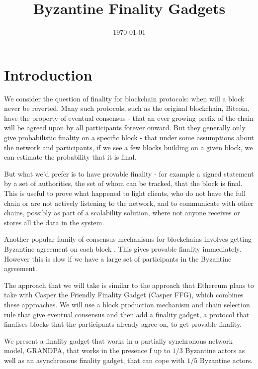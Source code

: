 \documentclass{article}
\begin{document}
\title{Byzantine Finality Gadgets}
\date{\today}
\maketitle

\section{Introduction}

We consider the question of finality for blockchain protocols: when will a block never be reverted. Many such protocols, such as the original blockchain, Bitcoin, have the property of eventual consensus - that an ever growing prefix of the chain will be agreed upon by all participants forever onward. But they generally only give probabilistic finality on a specific block - that under some assumptions about the network and participants, if we see a few blocks building on a given block, we can estimate the probability that it is final.

But what we'd prefer is to have provable finality - for example a signed statement by a set of authorities, the set of whom can be tracked, that the block is final.
This is useful to prove what happened to light clients, who do not have the full chain or are not actively listening to the network, and to communicate with other chains, possibly as part of a scalability solution, where not anyone receives or stores all the data in the system. 

Another popular family of consensus mechanisms for blockchains involves getting Byzantine agreement on each block \cite{Tendermint.AlgorandAgreement}.
This gives provable finality immediately. However this is slow if we have a large set of participants in the Byzantine agreement.

The approach that we will take is similar to the approach that Ethereum plans to take with Casper the Friendly Finality Gadget (Casper FFG)\cite{CasperFFG}, which combines these approaches.
We will use a block production mechanism and chain selection rule that give eventual consensus and then add a finality gadget, a protocol that finalises blocks that the participants already agree on, to get provable finality.

We present a finality gadget that works in a partially synchronous network model, GRANDPA, that works in the presence f up to $1/3$ Byzantine actors as well as an asynchronous finality gadget, that can cope with $1/5$ Byzantine actors. 
\end{document}
